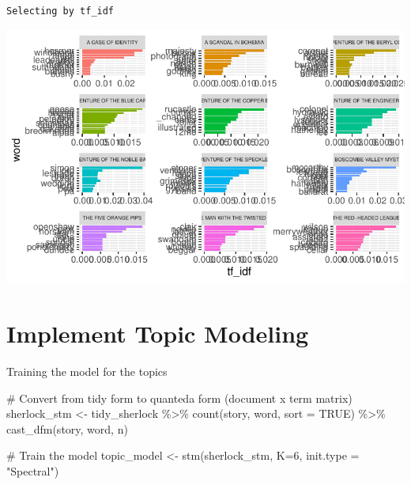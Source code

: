 \documentclass[
  letterpaper,
  DIV=11,
  numbers=noendperiod]{scrreprt}
\newenvironment{Shaded}{\begin{snugshade}}{\end{snugshade}}
\newcommand{\AttributeTok}[1]{\textcolor[rgb]{0.40,0.45,0.13}{#1}}
\newcommand{\CommentTok}[1]{\textcolor[rgb]{0.37,0.37,0.37}{#1}}
\newcommand{\ConstantTok}[1]{\textcolor[rgb]{0.56,0.35,0.01}{#1}}
\newcommand{\DecValTok}[1]{\textcolor[rgb]{0.68,0.00,0.00}{#1}}
\newcommand{\FunctionTok}[1]{\textcolor[rgb]{0.28,0.35,0.67}{#1}}
\newcommand{\NormalTok}[1]{\textcolor[rgb]{0.00,0.23,0.31}{#1}}
\newcommand{\OtherTok}[1]{\textcolor[rgb]{0.00,0.23,0.31}{#1}}
\newcommand{\SpecialCharTok}[1]{\textcolor[rgb]{0.37,0.37,0.37}{#1}}
\newcommand{\StringTok}[1]{\textcolor[rgb]{0.13,0.47,0.30}{#1}}
\begin{document}
\begin{verbatim}
Selecting by tf_idf
\end{verbatim}

\includegraphics{src/projects/topic-modeling-r_files/figure-pdf/unnamed-chunk-6-1.pdf}

\section{Implement Topic Modeling}\label{implement-topic-modeling}

Training the model for the topics

\begin{Shaded}
\begin{Highlighting}[]
\CommentTok{\# Convert from tidy form to quanteda form (document x term matrix)}
\NormalTok{sherlock\_stm }\OtherTok{\textless{}{-}}\NormalTok{ tidy\_sherlock }\SpecialCharTok{\%\textgreater{}\%} 
  \FunctionTok{count}\NormalTok{(story, word, }\AttributeTok{sort =} \ConstantTok{TRUE}\NormalTok{) }\SpecialCharTok{\%\textgreater{}\%} 
  \FunctionTok{cast\_dfm}\NormalTok{(story, word, n)}

\CommentTok{\# Train the model}
\NormalTok{topic\_model }\OtherTok{\textless{}{-}} \FunctionTok{stm}\NormalTok{(sherlock\_stm, }\AttributeTok{K=}\DecValTok{6}\NormalTok{, }\AttributeTok{init.type =} \StringTok{"Spectral"}\NormalTok{)}
\end{Highlighting}
\end{Shaded}
\end{document}

